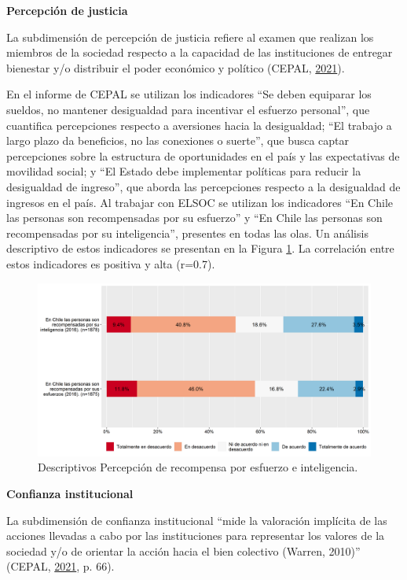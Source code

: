 \documentclass[
  12pt,
]{book}
\begin{document}
\textbf{Percepción de justicia}

La subdimensión de percepción de justicia refiere al examen que realizan los miembros de la sociedad respecto a la capacidad de las instituciones de entregar bienestar y/o distribuir el poder económico y político (CEPAL, \protect\hyperlink{ref-cepal_Cohesion_2021}{2021}).

En el informe de CEPAL se utilizan los indicadores ``Se deben equiparar los sueldos, no mantener desigualdad para incentivar el esfuerzo personal'', que cuantifica percepciones respecto a aversiones hacia la desigualdad; ``El trabajo a largo plazo da beneficios, no las conexiones o suerte'', que busca captar percepciones sobre la estructura de oportunidades en el país y las expectativas de movilidad social; y ``El Estado debe implementar políticas para reducir la desigualdad de ingreso'', que aborda las percepciones respecto a la desigualdad de ingresos en el país. Al trabajar con ELSOC se utilizan los indicadores ``En Chile las personas son recompensadas por su esfuerzo'' y ``En Chile las personas son recompensadas por su inteligencia'', presentes en todas las olas. Un análisis descriptivo de estos indicadores se presentan en la Figura \ref{fig:justicia}. La correlación entre estos indicadores es positiva y alta (r=0.7).

\begin{figure}[H]

{\centering \includegraphics[width=1\linewidth,height=1\textheight]{output/graphs/justicia} 

}

\caption{Descriptivos Percepción de recompensa por esfuerzo e inteligencia.}\label{fig:justicia}
\end{figure}

\textbf{Confianza institucional}

La subdimensión de confianza institucional ``mide la valoración implícita de las acciones llevadas a cabo por las instituciones para representar los valores de la sociedad y/o de orientar la acción hacia el bien colectivo (Warren, 2010)'' (CEPAL, \protect\hyperlink{ref-cepal_Cohesion_2021}{2021}, p. 66).
\end{document}

